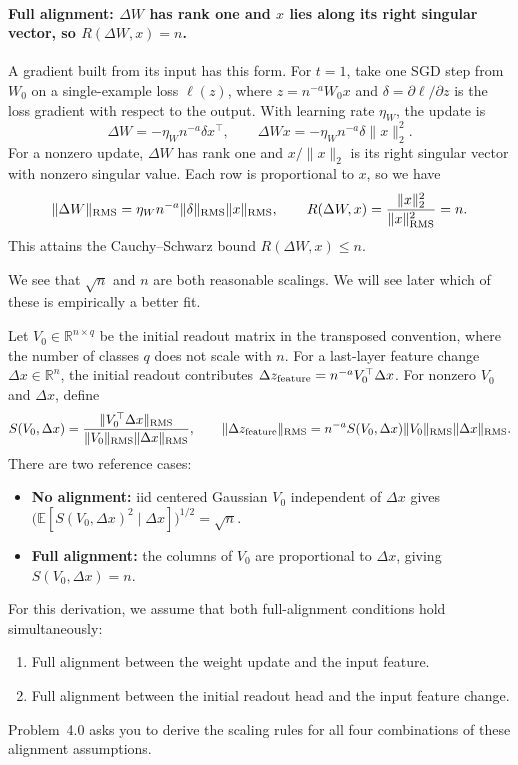 \paragraph{Full alignment: $\Delta W$ has rank one and $x$ lies along its right singular vector, so $R(\Delta W,x)=n$.}
A gradient built from its input has this form. For $t=1$, take one SGD step from $W_0$ on a single-example loss $\ell(z)$,
where $z=n^{-a}W_0x$ and $\delta=\partial\ell/\partial z$ is the loss gradient
with respect to the output. With learning rate $\eta_W$, the update is
\[
 \Delta W=-\eta_W n^{-a}\delta x^\top,\qquad
 \Delta W x=-\eta_W n^{-a}\delta\|x\|_2^2.
\]
For a nonzero update, $\Delta W$ has rank one and $x/\|x\|_2$ is its
right singular vector with nonzero singular value. Each row is proportional
to $x$, so we have
\[
 \|\Delta W\|_{\rm RMS}
 =\eta_W n^{-a}\|\delta\|_{\rm RMS}\|x\|_{\rm RMS},\qquad
 R(\Delta W,x)=\frac{\|x\|_2^2}{\|x\|_{\rm RMS}^2}=n.
\]
This attains the Cauchy--Schwarz bound $R(\Delta W,x)\le n$.

We see that $\sqrt{n}$ and $n$ are both reasonable scalings.
We will see later which of these is empirically a better fit.


Let $V_0\in\mathbb R^{n\times q}$ be the initial readout matrix in the
transposed convention, where the number of classes $q$ does not scale with $n$.
For a last-layer feature change $\Delta x\in\mathbb R^n$, the initial
readout contributes $\Delta z_{\rm feature}=n^{-a}V_0^\top\Delta x$.
For nonzero $V_0$ and $\Delta x$, define
\[
 S(V_0,\Delta x)=\frac{\|V_0^\top\Delta x\|_{\rm RMS}}
 {\|V_0\|_{\rm RMS}\|\Delta x\|_{\rm RMS}},\qquad
 \|\Delta z_{\rm feature}\|_{\rm RMS}
 =n^{-a}S(V_0,\Delta x)\|V_0\|_{\rm RMS}\|\Delta x\|_{\rm RMS}.
\]
There are two reference cases:
\begin{itemize}
\item \textbf{No alignment:} iid centered Gaussian $V_0$ independent of $\Delta x$
gives $\bigl(\mathbb E[S(V_0,\Delta x)^2\mid\Delta x]\bigr)^{1/2}=\sqrt n$.
\item \textbf{Full alignment:} the columns of $V_0$ are proportional to $\Delta x$,
giving $S(V_0,\Delta x)=n$.
\end{itemize}

For this derivation, we assume that both full-alignment conditions hold simultaneously:
\begin{enumerate}
\item Full alignment between the weight update and the input feature.
\item Full alignment between the initial readout head and the input feature change.
\end{enumerate}
Problem~4.0 asks you to derive the scaling rules for all four combinations of
these alignment assumptions.

